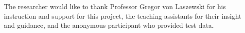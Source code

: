 \documentclass[sigconf]{acmart}
\begin{document}
\begin{acks}
The researcher would like to thank Professor Gregor von Laszewski for his instruction and support for this project, the teaching assistants for their insight and guidance, and the anonymous participant who provided test data.
\end{acks}


 
\end{document}
